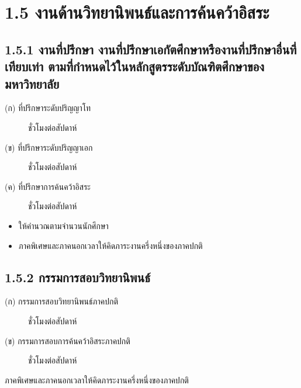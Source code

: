 \documentclass[a4paper,12pt,english]{sphinxmanual}
\begin{document}
\section{1.5 งานด้านวิทยานิพนธ์และการค้นคว้าอิสระ}
\label{\detokenize{1teaching:id18}}

\subsection{1.5.1 งานที่ปรึกษา งานที่ปรึกษาเอกัตศึกษาหรืองานที่ปรึกษาอื่นที่เทียบเท่า ตามที่กำหนดไว้ในหลักสูตรระดับบัณฑิตศึกษาของมหาวิทยาลัย}
\label{\detokenize{1teaching:id19}}\begin{description}
\item[{(ก) ที่ปรึกษาระดับปริญญาโท}]  ชั่วโมงต่อสัปดาห์

\item[{(ข) ที่ปรึกษาระดับปริญญาเอก}]  ชั่วโมงต่อสัปดาห์

\item[{(ค) ที่ปรึกษาการค้นคว้าอิสระ}]  ชั่วโมงต่อสัปดาห์

\end{description}
\begin{itemize}
\item {} 
ให้คำนวณตามจำนวนนักศึกษา

\item {} 
ภาคพิเศษและภาคนอกเวลาให้คิดภาระงานครึ่งหนึ่งของภาคปกติ

\end{itemize}


\subsection{1.5.2 กรรมการสอบวิทยานิพนธ์}
\label{\detokenize{1teaching:id20}}\begin{description}
\item[{(ก) กรรมการสอบวิทยานิพนธ์ภาคปกติ}]  ชั่วโมงต่อสัปดาห์

\item[{(ข) กรรมการสอบการค้นคว้าอิสระภาคปกติ}]  ชั่วโมงต่อสัปดาห์

\end{description}

ภาคพิเศษและภาคนอกเวลาให้คิดภาระงานครึ่งหนึ่งของภาคปกติ
\end{document}
